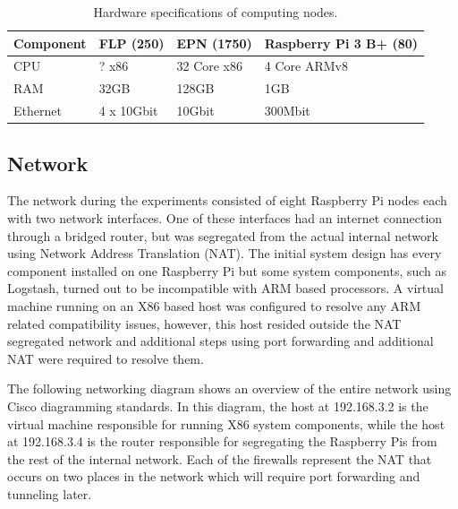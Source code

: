 \documentclass[]{article}
\begin{document}
\begin{table}[H]
	\begin{center}
		\begin{tabular}{ | l | l | l | l | }
			\hline
			\textbf{Component} & \textbf{FLP (250)} & \textbf{EPN (1750)} & \textbf{Raspberry Pi 3 B+ (80)} \\ \hline
			
			CPU & ? x86 & 32 Core x86 & 4 Core ARMv8 \\ \hline
			RAM & 32GB & 128GB & 1GB \\ \hline
			Ethernet & 4 x 10Gbit & 10Gbit & 300Mbit \\ \hline
		\end{tabular}
		\caption{Hardware specifications of computing nodes.}
		\label{tab:specs}
	\end{center}
\end{table}

\subsection{Network}
The network during the experiments consisted of eight Raspberry Pi nodes each with two network interfaces. One of these interfaces had an internet connection through a bridged router, but was segregated from the actual internal network using Network Address Translation (NAT). The initial system design has every component installed on one Raspberry Pi but some system components, such as Logstash, turned out to be incompatible with ARM based processors. A virtual machine running on an X86 based host was configured to resolve any ARM related compatibility issues, however, this host resided outside the NAT segregated network and additional steps using port forwarding and additional NAT were required to resolve them.

The following networking diagram shows an overview of the entire network using Cisco diagramming standards. In this diagram, the host at 192.168.3.2 is the virtual machine responsible for running X86 system components, while the host at 192.168.3.4 is the router responsible for segregating the Raspberry Pis from the rest of the internal network. Each of the firewalls represent the NAT that occurs on two places in the network which will require port forwarding and tunneling later.
\end{document}
